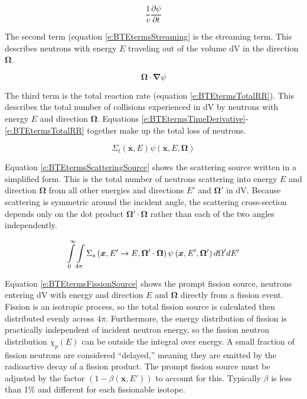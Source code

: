 \begin{equation}\label{e:BTEtermsTimeDerivative}
\frac{1}{v} \frac{\partial \psi}{\partial t}
\end{equation}

The second term (equation \ref{e:BTEtermsStreaming} is the streaming term.  This describes neutrons with energy $E$ traveling out of the volume dV in the direction $\bm\Omega$.

\begin{equation}\label{e:BTEtermsStreaming}
\bm \Omega \cdot \bm \nabla \psi
\end{equation}

The third term is the total reaction rate (equation \ref{e:BTEtermsTotalRR}).  This describes the total number of collisions experienced in dV by neutrons with energy $E$ and direction $\bm\Omega$.  Equations \ref{e:BTEtermsTimeDerivative}-\ref{e:BTEtermsTotalRR} together make up the total loss of neutrons.

\begin{equation}\label{e:BTEtermsTotalRR}
\Sigma_t\left(\bm x,E\right)\psi\left(\bm x,E,\bm\Omega\right)
\end{equation}

Equation \ref{e:BTEtermsScatteringSource} shows the scattering source written in a simplified form.  This is the total number of neutrons scattering into energy $E$ and direction $\bm\Omega$ from all other energies and directions $E'$ and $\bm\Omega'$ in dV.  Because scattering is symmetric around the incident angle, the scattering cross-section depends only on the dot product $\bm\Omega'\cdot\bm\Omega$ rather than each of the two angles independently.

\begin{equation}\label{e:BTEtermsScatteringSource}
\intop_0^{\infty} \intop_{4\pi} \Sigma_s\left(\bm x,E' \rightarrow E, \bm \Omega' \cdot \bm \Omega\right) \psi\left(\bm x,E',\bm \Omega'\right) d\Omega' dE'
\end{equation}

Equation \ref{e:BTEtermsFissionSource} shows the prompt fission source, neutrons entering dV with energy and direction $E$ and $\bm\Omega$ directly from a fission event.  Fission is an isotropic process, so the total fission source is calculated then distributed evenly across $4\pi$.  Furthermore, the energy distribution of fission is practically independent of incident neutron energy, so the fission neutron distribution $\chi_p\left(E\right)$ can be outside the integral over energy.  A small fraction of fission neutrons are considered ``delayed,'' meaning they are emitted by the radioactive decay of a fission product.  The prompt fission source must be adjusted by the factor $\left(1-\beta\left(\bm x,E'\right)\right)$ to account for this.  Typically $\beta$ is less than 1\% and different for each fissionable isotope.


